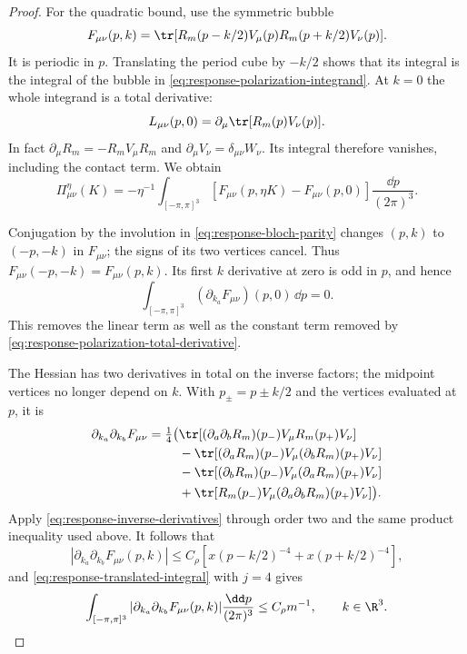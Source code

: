 \documentclass[11pt,letterpaper,reqno]{amsart}
\begin{document}
\begin{proof}
For the quadratic bound, use the symmetric bubble
\[
 F_{\mu\nu}(p,k)=
 \tr[R_m(p-k/2)V_\mu(p)R_m(p+k/2)V_\nu(p)].
\]
It is periodic in $p$. Translating the period cube by $-k/2$
shows that its integral is the integral of the bubble in
\eqref{eq:response-polarization-integrand}. At $k=0$ the
whole integrand is a total derivative:
\begin{equation}\label{eq:response-polarization-total-derivative}
 L_{\mu\nu}(p,0)=
    \partial_\mu\tr[R_m(p)V_\nu(p)].
\end{equation}
In fact $\partial_\mu R_m=-R_mV_\mu R_m$ and
$\partial_\mu V_\nu=\delta_{\mu\nu}W_\nu$. Its integral
therefore vanishes, including the contact term. We obtain
\begin{equation}\label{eq:response-polarization-subtracted}
 \Pi^\eta_{\mu\nu}(K)=
     -\eta^{-1}\int_{[-\pi,\pi]^3}
          [F_{\mu\nu}(p,\eta K)-F_{\mu\nu}(p,0)]
                                      \frac{\dd p}{(2\pi)^3}.
\end{equation}

Conjugation by the involution in
\eqref{eq:response-bloch-parity} changes $(p,k)$ to $(-p,-k)$
in $F_{\mu\nu}$; the signs of its two vertices cancel.
Thus $F_{\mu\nu}(-p,-k)=F_{\mu\nu}(p,k)$.
Its first $k$ derivative at zero is odd in $p$, and hence
\begin{equation}\label{eq:response-polarization-parity-cancellation}
 \int_{[-\pi,\pi]^3}
              (\partial_{k_a}F_{\mu\nu})(p,0)\,\dd p=0.
\end{equation}
This removes the linear term as well as the constant term
removed by \eqref{eq:response-polarization-total-derivative}.

The Hessian has two derivatives in total on the inverse factors;
the midpoint vertices no longer depend on $k$. With $p_\pm=p\pm k/2$
and the vertices evaluated at $p$, it is
\begin{align*}
 \partial_{k_a}\partial_{k_b}F_{\mu\nu}
 =\tfrac14\big(&
  \tr[(\partial_a\partial_bR_m)(p_-)V_\mu R_m(p_+)V_\nu]\\
 &-\tr[(\partial_aR_m)(p_-)V_\mu(\partial_bR_m)(p_+)V_\nu]\\
 &-\tr[(\partial_bR_m)(p_-)V_\mu(\partial_aR_m)(p_+)V_\nu]\\
 &+\tr[R_m(p_-)V_\mu(\partial_a\partial_bR_m)(p_+)V_\nu]\big).
\end{align*}
Apply \eqref{eq:response-inverse-derivatives} through order two
and the same product inequality used above. It follows that
\[
 |\partial_{k_a}\partial_{k_b}F_{\mu\nu}(p,k)|
               \le C_\rho[x(p-k/2)^{-4}+x(p+k/2)^{-4}],
\]
and \eqref{eq:response-translated-integral} with $j=4$ gives
\begin{equation}\label{eq:response-polarization-hessian}
 \int_{[-\pi,\pi]^3}
     |\partial_{k_a}\partial_{k_b}F_{\mu\nu}(p,k)|
                             \frac{\dd p}{(2\pi)^3}
                  \le C_\rho m^{-1},\qquad k\in\R^3.
\end{equation}


\end{proof}
\end{document}
